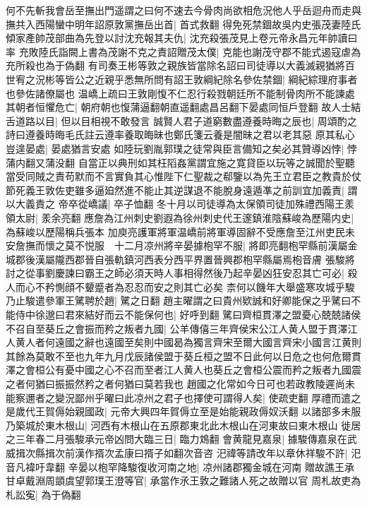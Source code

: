 何不先斬我會岳至撫出門遥謂之曰何不速去今骨肉尚欲相危況他人乎岳迴舟而走與撫共入西陽蠻中明年詔原敦黨撫岳出首|{
	首式救翻}
得免死禁錮故吳内史張茂妻陸氏傾家產帥茂部曲為先登以討沈充報其夫仇|{
	沈充殺張茂見上卷元帝永昌元年帥讀曰率}
充敗陸氏詣闕上書為茂謝不克之責詔贈茂太僕|{
	克能也謝茂守郡不能式遏寇虐為充所殺也為于偽翻}
有司奏王彬等敦之親族皆當除名詔曰司徒導以大義滅親猶將百世宥之況彬等皆公之近親乎悉無所問有詔王敦綱紀除名參佐禁錮|{
	綱紀綜理府事者也參佐諸僚屬也}
温嶠上疏曰王敦剛愎不仁忍行殺戮朝廷所不能制骨肉所不能諫處其朝者恒懼危亡|{
	朝府朝也愎蒲逼翻朝直遥翻處昌呂翻下晏處同恒戶登翻}
故人士結舌道路以目|{
	但以目相視不敢發言}
誠賢人君子道窮數盡遵養時晦之辰也|{
	周頌酌之詩曰遵養時晦毛氏註云遵率養取晦昧也鄭氏箋云養是闇昧之君以老其惡}
原其私心豈遑晏處|{
	晏處猶言安處}
如陸玩劉胤郭璞之徒常與臣言備知之矣必其贊導凶悖|{
	悖蒲内翻又蒲没翻}
自當正以典刑如其枉䧟姦黨謂宜施之寛貸臣以玩等之誠聞於聖聽當受同賊之責苟默而不言實負其心惟陛下仁聖裁之郗鑒以為先王立君臣之教貴於仗節死義王敦佐吏雖多逼廹然進不能止其逆謀退不能脫身遠遁凖之前訓宜加義責|{
	謂以大義責之}
帝卒從嶠議|{
	卒子恤翻}
冬十月以司徒導為太保領司徒加殊禮西陽王羕領太尉|{
	羕余亮翻}
應詹為江州刺史劉遐為徐州刺史代王邃鎮淮陰蘇峻為歷陽内史|{
	為蘇峻以歷陽稱兵張本}
加庾亮護軍將軍温嶠前將軍導固辭不受應詹至江州吏民未安詹撫而懷之莫不悦服　十二月凉州將辛晏據枹罕不服|{
	將即亮翻枹罕縣前漢屬金城郡後漢屬隴西郡晉自張軌鎮河西表分西平界置晉興郡枹罕縣屬焉枹音膚}
張駿將討之從事劉慶諫曰霸王之師必須天時人事相得然後乃起辛晏凶狂安忍其亡可必|{
	殺人而心不矜惻顔不顰蹙者為忍忍而安之則其亡必矣}
柰何以饑年大舉盛寒攻城乎駿乃止駿遣參軍王騭聘於趙|{
	騭之日翻}
趙主曜謂之曰貴州欵誠和好卿能保之乎騭曰不能侍中徐邈曰君來結好而云不能保何也|{
	好呼到翻}
騭曰齊桓貫澤之盟憂心兢兢諸侯不召自至葵丘之會振而矜之叛者九國|{
	公羊傳僖三年齊侯宋公江人黄人盟于貫澤江人黄人者何遠國之辭也遠國至矣則中國曷為獨言齊宋至爾大國言齊宋小國言江黄則其餘為莫敢不至也九年九月戊辰諸侯盟于葵丘桓之盟不日此何以日危之也何危爾貫澤之會桓公有憂中國之心不召而至者江人黄人也葵丘之會桓公震而矜之叛者九國震之者何猶曰振振然矜之者何猶曰莫若我也}
趙國之化常如今日可也若政教陵遲尚未能察邇者之變況鄙州乎曜曰此凉州之君子也擇使可謂得人矣|{
	使疏吏翻}
厚禮而遣之　是歲代王賀傉始親國政|{
	元帝大興四年賀傉立至是始能親政傉奴沃翻}
以諸部多未服乃築城於東木根山|{
	河西有木根山在五原郡東北此木根山在河東故曰東木根山}
徙居之三年春二月張駿承元帝凶問大臨三日|{
	臨力鴆翻}
會黄龍見嘉泉|{
	據駿傳嘉泉在武威揖次縣揖次前漢作揟次孟康曰揟子如翻次音咨}
汜禕等請改年以章休祥駿不許|{
	汜音凡褘吁韋翻}
辛晏以枹罕降駿復收河南之地|{
	凉州諸郡獨金城在河南}
贈故譙王承甘卓戴淵周顗虞望郭璞王澄等官|{
	承當作氶王敦之難諸人死之故贈以官}
周札故吏為札訟寃|{
	為于偽翻}
